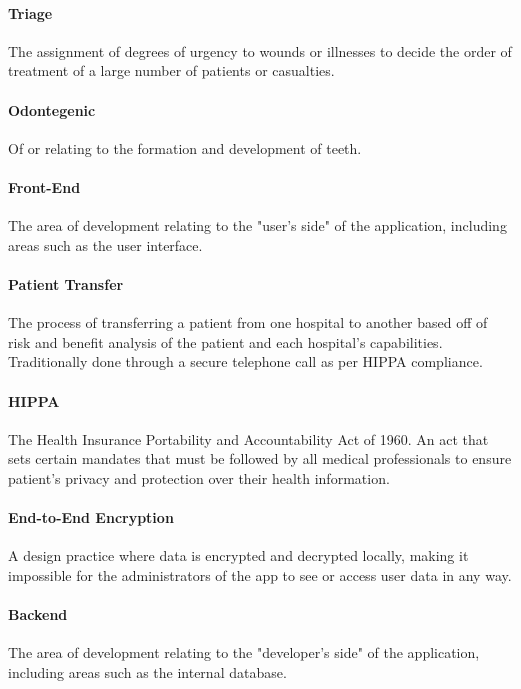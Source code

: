 \documentclass[11pt,letterpaper]{article}
\begin{document}
\paragraph{Triage}
The assignment of degrees of urgency to wounds or illnesses to decide the order of treatment of a large number of patients or casualties.

\paragraph{Odontegenic}
Of or relating to the formation and development of teeth.

\paragraph{Front-End} The area of development relating to the "user's side" of the application, including areas such as the user interface.

\paragraph{Patient Transfer} The process of transferring a patient from one hospital to another based off of risk and benefit analysis of the patient and each hospital's capabilities. Traditionally done through a secure telephone call as per HIPPA compliance.

\paragraph{HIPPA} The Health Insurance Portability and Accountability Act of 1960. An act that sets certain mandates that must be followed by all medical professionals to ensure patient's privacy and protection over their health information.

\paragraph{End-to-End Encryption}
A design practice where data is encrypted and decrypted locally, making it impossible for the administrators of the app to see or access user data in any way.

\paragraph{Backend}
The area of development relating to the "developer's side" of the application, including areas such as the internal database.
\end{document}
